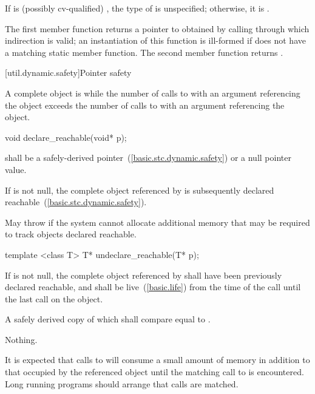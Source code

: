 \begin{itemdescr}
\pnum
\remark If  is (possibly cv-qualified) , the type of
 is unspecified; otherwise, it is .

\pnum
\returns The first member function returns a pointer to 
obtained by calling  through which
indirection is valid; an instantiation of this function is
ill-formed if  does not have a matching  static member
function. The second member function returns .
\end{itemdescr}

[util.dynamic.safety]{Pointer safety}

\pnum
A complete object is  while the number of calls to
 with an argument referencing the object exceeds the
number of calls to  with an argument referencing the
object.

%
\begin{itemdecl}
void declare_reachable(void* p);
\end{itemdecl}

\begin{itemdescr}
\pnum
\requires {} shall be a safely-derived
pointer~(\ref{basic.stc.dynamic.safety}) or a null pointer value.

\pnum
\effects If  is not null, the complete object referenced by 
is subsequently declared reachable~(\ref{basic.stc.dynamic.safety}).

\pnum
\throws May throw  if the system cannot allocate
additional memory that may be required to track objects declared reachable.
\end{itemdescr}

%
\begin{itemdecl}
template <class T> T* undeclare_reachable(T* p);
\end{itemdecl}

\begin{itemdescr}
\pnum
\requires If  is not null, the complete object referenced by 
shall have been previously declared reachable, and shall be
live~(\ref{basic.life}) from the time of the call until the last
 call on the object.

\pnum
\returns A safely derived copy of  which shall compare equal to .

\pnum
\throws Nothing.

\pnum \enternote It is expected that calls to  will consume
a small amount of memory in addition to that occupied by the referenced object until the
matching call to  is encountered. Long running programs
should arrange that calls are matched. \exitnote \end{itemdescr}

